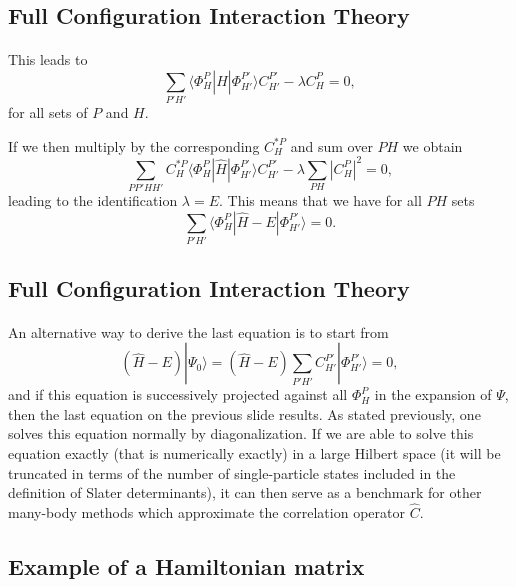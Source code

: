 \documentclass[%
oneside,                 %
final,                   %
10pt]{article}
\begin{document}
\subsection*{Full Configuration Interaction Theory}

\paragraph{}

This leads to 
\[
\sum_{P'H'}\langle \Phi_H^P | \hat{H} |\Phi_{H'}^{P'} \rangle C_{H'}^{P'}-\lambda C_H^{P}=0,
\]
for all sets of $P$ and $H$.

If we then multiply by the corresponding $C_H^{*P}$ and sum over $PH$ we obtain
\[ 
\sum_{PP'HH'}C_H^{*P}\langle \Phi_H^P | \hat{H} |\Phi_{H'}^{P'} \rangle C_{H'}^{P'}-\lambda\sum_{PH}|C_H^P|^2=0,
\]
leading to the identification $\lambda = E$. This means that we have for all $PH$ sets
\begin{equation}
\sum_{P'H'}\langle \Phi_H^P | \hat{H} -E|\Phi_{H'}^{P'} \rangle = 0. \label{eq:fullci}
\end{equation}



\subsection*{Full Configuration Interaction Theory}

\paragraph{}
An alternative way to derive the last equation is to start from 
\[
(\hat{H} -E)|\Psi_0\rangle = (\hat{H} -E)\sum_{P'H'}C_{H'}^{P'}|\Phi_{H'}^{P'} \rangle=0, 
\]
and if this equation is successively projected against all $\Phi_H^P$ in the expansion of $\Psi$, then the last equation on the previous slide
results.   As stated previously, one solves this equation normally by diagonalization. If we are able to solve this equation exactly (that is
numerically exactly) in a large Hilbert space (it will be truncated in terms of the number of single-particle states included in the definition
of Slater determinants), it can then serve as a benchmark for other many-body methods which approximate the correlation operator
$\hat{C}$.



\subsection*{Example of a Hamiltonian matrix}
\end{document}
